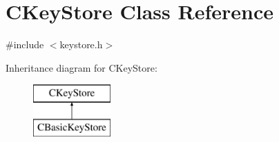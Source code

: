 \hypertarget{class_c_key_store}{}\section{C\+Key\+Store Class Reference}
\label{class_c_key_store}


{\ttfamily \#include $<$keystore.\+h$>$}

Inheritance diagram for C\+Key\+Store\+:\begin{figure}[H]
\begin{center}
\leavevmode
\includegraphics[height=2.000000cm]{class_c_key_store}
\end{center}
\end{figure}
